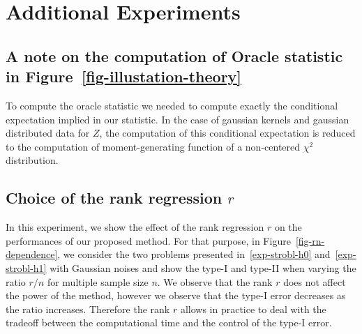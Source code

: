 \section{Additional Experiments}
\subsection{A note on the computation of Oracle statistic in Figure~\ref{fig-illustation-theory}}
\label{sec-theoritical-findings}

To compute the oracle statistic we needed to compute exactly the conditional expectation implied in our statistic. In the case of gaussian kernels and gaussian distributed data for $Z$, the computation of this conditional expectation is reduced to the computation of moment-generating function of a non-centered $\chi^2$ distribution.

\newpage
\subsection{Choice of the rank regression $r$}
\label{sec-rank-rn}
In this experiment, we show the effect of the rank regression $r$ on the performances of our proposed method. For that purpose, in Figure~\ref{fig-rn-dependence}, we consider the two problems presented in~\eqref{exp-strobl-h0} and~\eqref{exp-strobl-h1}  with Gaussian noises and show the type-I and type-II when varying the ratio $r/n$ for multiple sample size $n$. We observe that the rank $r$ does not affect the power of the method, however we observe that the type-I error decreases as the ratio increases. Therefore the rank $r$ allows in practice to deal with the tradeoff between the computational time and the control of the type-I error.

